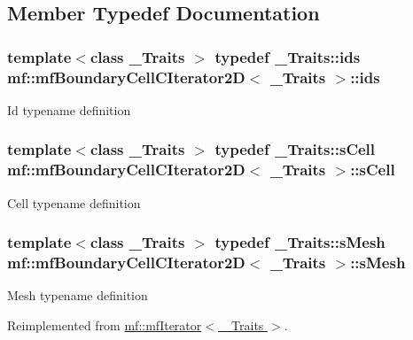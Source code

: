 \subsection{Member Typedef Documentation}
\hypertarget{classmf_1_1mfBoundaryCellCIterator2D_a7b3c67238a3b4186e08f6fa05c11db31}{
\subsubsection[{ids}]{\setlength{\rightskip}{0pt plus 5cm}template$<$class \_\-Traits $>$ typedef \_\-Traits::ids {\bf mf::mfBoundaryCellCIterator2D}$<$ \_\-Traits $>$::{\bf ids}}}
\label{classmf_1_1mfBoundaryCellCIterator2D_a7b3c67238a3b4186e08f6fa05c11db31}
Id typename definition \hypertarget{classmf_1_1mfBoundaryCellCIterator2D_a0932e77a4d182a0c8a376b8ba1026e11}{
\subsubsection[{sCell}]{\setlength{\rightskip}{0pt plus 5cm}template$<$class \_\-Traits $>$ typedef \_\-Traits::sCell {\bf mf::mfBoundaryCellCIterator2D}$<$ \_\-Traits $>$::{\bf sCell}}}
\label{classmf_1_1mfBoundaryCellCIterator2D_a0932e77a4d182a0c8a376b8ba1026e11}
Cell typename definition \hypertarget{classmf_1_1mfBoundaryCellCIterator2D_a7cd4a533656715c1768db299fbd3e738}{
\subsubsection[{sMesh}]{\setlength{\rightskip}{0pt plus 5cm}template$<$class \_\-Traits $>$ typedef \_\-Traits::sMesh {\bf mf::mfBoundaryCellCIterator2D}$<$ \_\-Traits $>$::{\bf sMesh}}}
\label{classmf_1_1mfBoundaryCellCIterator2D_a7cd4a533656715c1768db299fbd3e738}
Mesh typename definition 

Reimplemented from \hyperlink{classmf_1_1mfIterator_aca31e4d7e7eca4e3b100530d8725064b}{mf::mfIterator$<$ \_\-Traits $>$}.



